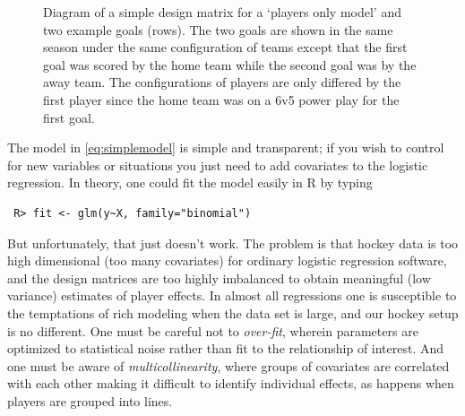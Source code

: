 \begin{figure}[hbt]
    \centering
    \caption{Diagram of a simple design matrix for a `players only model' and two example goals (rows). The two goals are shown in the same season under the same configuration of teams except that the first goal was scored by the home team while the second goal was by the away team. The configurations of players are only differed by the first player since the home team was on a 6v5 power play for the first goal. }\label{fig:data}
\end{figure}

The model in \ref{eq:simplemodel} is simple and transparent; if you wish to
control for new variables or situations you just need to add covariates to the
logistic regression. In theory, one could fit the model easily in  {\sf R} by
typing \begin{verbatim} R> fit <- glm(y~X, family="binomial") \end{verbatim}
But unfortunately, that just doesn't work.   The problem is that hockey data
is too high dimensional (too many covariates) for ordinary logistic regression
software, and the design matrices are too highly imbalanced to obtain
meaningful (low variance) estimates of player effects.   In almost all
regressions one is susceptible to the temptations of rich modeling when the
data set is large, and our hockey setup is no different. One must be careful
not to {\em over-fit}, wherein parameters are optimized to statistical noise
rather than fit to the relationship of interest.  And one must be aware of
{\em multicollinearity}, where groups of covariates are correlated with each
other making it difficult to identify individual effects, as happens when
players are grouped into lines.  



